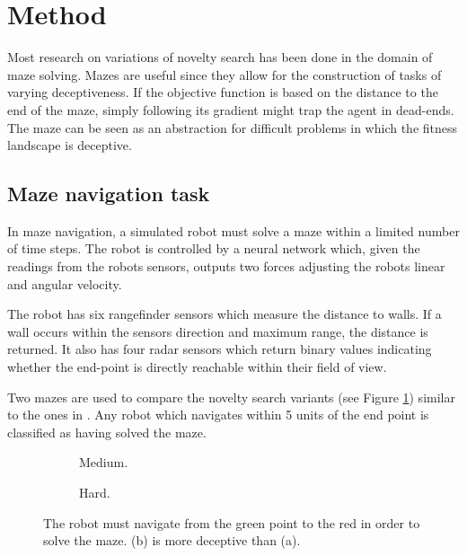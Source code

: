 \section{Method}
Most research on variations of novelty search has been done in the domain of maze solving. Mazes are useful
since they allow for the construction of tasks of varying deceptiveness. If the objective function is
based on the distance to the end of the maze, simply following its gradient might trap the agent in
dead-ends. The maze can be seen as an abstraction for difficult problems in which the fitness
landscape is deceptive.

\subsection{Maze navigation task}
In maze navigation, a simulated robot must solve a maze within a limited number of time steps.
The robot is controlled by a neural network which, given the readings from the robots sensors,
outputs two forces adjusting the robots linear and angular velocity.

The robot has six rangefinder sensors which measure the distance to walls. If a wall occurs within the sensors
direction and maximum range, the distance is returned. It also has four radar sensors which return binary
values indicating whether the end-point is directly reachable within their field of view.

Two mazes are used to compare the novelty search variants (see Figure \ref{mazes}) similar to the ones in \cite{novelty_alone}.
Any robot which navigates within 5 units of the end point is classified as having solved the maze.

\begin{figure}[H]
    \captionsetup[subfigure]{justification=centering}
    \centering
    \begin{mdframed}
        \begin{subfigure}[b]{0.45\textwidth}
            \centering
            \hspace*{2em}\scalebox{0.3}{}
            \caption{Medium.}
        \end{subfigure}
        \begin{subfigure}[b]{0.5\textwidth}
            \centering
            \hspace*{5em}\scalebox{0.3}{}
            \caption{Hard.}
        \end{subfigure}
    \end{mdframed}
    \caption{The robot must navigate from the green point to the red in order to solve the maze.
             (b) is more deceptive than (a).}
    \label{mazes}
\end{figure}

